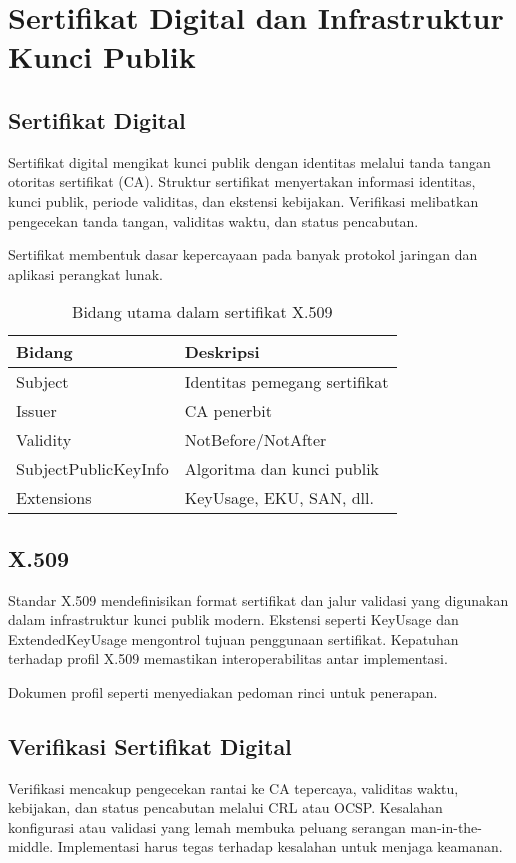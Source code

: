 \documentclass[../main.tex]{subfiles}
\begin{document}
\chapter{Sertifikat Digital dan Infrastruktur Kunci Publik}

\section{Sertifikat Digital}
Sertifikat digital mengikat kunci publik dengan identitas melalui tanda tangan otoritas sertifikat (CA). Struktur sertifikat menyertakan informasi identitas, kunci publik, periode validitas, dan ekstensi kebijakan. Verifikasi melibatkan pengecekan tanda tangan, validitas waktu, dan status pencabutan.

Sertifikat membentuk dasar kepercayaan pada banyak protokol jaringan dan aplikasi perangkat lunak.

\begin{table}[h]
\centering
\caption{Bidang utama dalam sertifikat X.509}
\label{tab:x509-fields}
\begin{tabular}{ll}
\toprule
Bidang & Deskripsi \\
\midrule
Subject & Identitas pemegang sertifikat \\
Issuer & CA penerbit \\
Validity & NotBefore/NotAfter \\
SubjectPublicKeyInfo & Algoritma dan kunci publik \\
Extensions & KeyUsage, EKU, SAN, dll. \\
\bottomrule
\end{tabular}
\end{table}

\section{X.509}
Standar X.509 mendefinisikan format sertifikat dan jalur validasi yang digunakan dalam infrastruktur kunci publik modern. Ekstensi seperti KeyUsage dan ExtendedKeyUsage mengontrol tujuan penggunaan sertifikat. Kepatuhan terhadap profil X.509 memastikan interoperabilitas antar implementasi.

Dokumen profil seperti \textcite{rfc5280} menyediakan pedoman rinci untuk penerapan.

\section{Verifikasi Sertifikat Digital}
Verifikasi mencakup pengecekan rantai ke CA tepercaya, validitas waktu, kebijakan, dan status pencabutan melalui CRL atau OCSP. Kesalahan konfigurasi atau validasi yang lemah membuka peluang serangan man-in-the-middle. Implementasi harus tegas terhadap kesalahan untuk menjaga keamanan.
\end{document}
